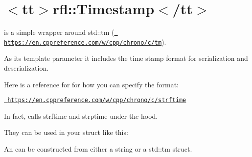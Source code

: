 \chapter{\texorpdfstring{$<$}{<}tt\texorpdfstring{$>$}{>}rfl\+::Timestamp\texorpdfstring{$<$}{<}/tt\texorpdfstring{$>$}{>}}
\hypertarget{md_external_2reflect-cpp_2docs_2timestamps}{}\label{md_external_2reflect-cpp_2docs_2timestamps}
\label{md_external_2reflect-cpp_2docs_2timestamps_autotoc_md702}%
%


{\ttfamily {}} is a simple wrapper around {\ttfamily std\+::tm} (\href{https://en.cppreference.com/w/cpp/chrono/c/tm}{\texttt{ https\+://en.\+cppreference.\+com/w/cpp/chrono/c/tm}}).

As its template parameter it includes the time stamp format for serialization and deserialization.

Here is a reference for for how you can specify the format\+:

\href{https://en.cppreference.com/w/cpp/chrono/c/strftime}{\texttt{ https\+://en.\+cppreference.\+com/w/cpp/chrono/c/strftime}}

In fact, {\ttfamily {}} calls {\ttfamily strftime} and {\ttfamily strptime} under-\/the-\/hood.

They can be used in your struct like this\+:


\begin{DoxyCode}{0}
\DoxyCodeLine{\};}

\end{DoxyCode}


An {\ttfamily {}} can be constructed from either a string or a {\ttfamily std\+::tm} struct.


\begin{DoxyCode}{0}

\end{DoxyCode}


